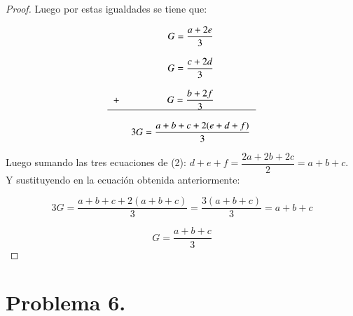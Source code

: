 \documentclass[11pt]{article}
\theoremstyle{Tema} \newtheorem{Tema}{Tema} %
\theoremstyle{Tema} \newtheorem{serie}{Serie}              %
\theoremstyle{Tema} \newtheorem{ejercicio}{Ejercicio}    %
\begin{document}
\begin{proof}
Luego por estas igualdades se tiene que:

\begin{center}
	\begin{equation*}
	\begin{tabular}{lc}
	& $G=\dfrac{a+2e}{3} $\\
	\\  
	 &$G=\dfrac{c+2d}{3} $\\ 
	 \\
	 +&$G=\dfrac{b+2f}{3}$\\
	\hline 
	\\
	 &$3G=\dfrac{a+b+c+2(e+d+f)}{3}$\\
	\end{tabular} 	
	\end{equation*}
	\end{center}

Luego sumando las tres ecuaciones de (2):
$ d+e+f=\dfrac{2a+2b+2c}{2}=a+b+c $. Y sustituyendo en la ecuaci\'on obtenida anteriormente:

\begin{equation*}
3G=\dfrac{a+b+c+2(a+b+c)}{3}=\dfrac{3(a+b+c)}{3}=a+b+c
\end{equation*}


\begin{equation*}
G=\dfrac{a+b+c}{3}
\end{equation*}
\end{proof}
\section*{\textbf{Problema 6.} }
\end{document}
